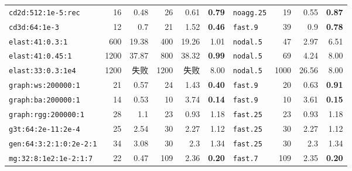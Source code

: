 {\begin{longtable}{lrrrrrlrrr}
\texttt{cd2d:512:1e-5:rec} & 16 & 0.48 & 26 & 0.61 & \textbf{0.79} & \texttt{noagg.25} & 19 & 0.55 & \textbf{0.87} \\
\texttt{cd3d:64:1e-3} & 12 & 0.7 & 21 & 1.52 & \textbf{0.46} & \texttt{fast.9} & 39 & 0.9 & \textbf{0.78} \\
\texttt{elast:41:0.3:1} & 600 & 19.38 & 400 & 19.26 & 1.01 & \texttt{nodal.5} & 47 & 2.97 & 6.51 \\
\texttt{elast:41:0.45:1} & 1200 & 37.87 & 800 & 38.32 & \textbf{0.99} & \texttt{nodal.5} & 69 & 4.24 & 8.00 \\
\texttt{elast:33:0.3:1e4} & 1200 & 失败 & 1200 & 失败 & 8.00 & \texttt{nodal.5} & 1000 & 26.56 & 8.00 \\
\texttt{graph:ws:200000:1} & 21 & 0.57 & 24 & 1.43 & \textbf{0.40} & \texttt{fast.9} & 20 & 0.63 & \textbf{0.91} \\
\texttt{graph:ba:200000:1} & 14 & 0.53 & 10 & 3.74 & \textbf{0.14} & \texttt{fast.9} & 10 & 3.61 & \textbf{0.15} \\
\texttt{graph:rgg:200000:1} & 28 & 1.1 & 23 & 0.93 & 1.18 & \texttt{fast.25} & 23 & 0.93 & 1.18 \\
\texttt{g3t:64:2e-11:2e-4} & 25 & 2.54 & 30 & 2.27 & 1.12 & \texttt{fast.25} & 30 & 2.27 & 1.12 \\
\texttt{gen:64:3:2:1:0:2e-2:1} & 34 & 3.08 & 30 & 2.3 & 1.34 & \texttt{fast.25} & 30 & 2.3 & 1.34 \\
\texttt{mg:32:8:1e2:1e-2:1:7} & 22 & 0.47 & 109 & 2.36 & \textbf{0.20} & \texttt{fast.7} & 109 & 2.35 & \textbf{0.20} \\
\end{longtable}}
